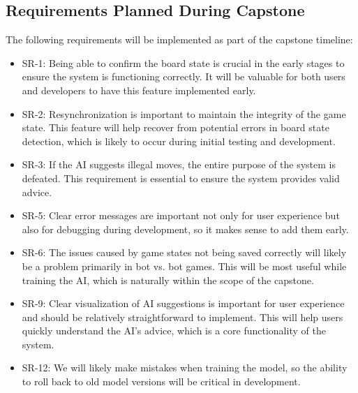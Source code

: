 \documentclass{article}
\begin{document}
\subsection{Requirements Planned During Capstone}\label{subsec:requirements-planned-during-capstone}
The following requirements will be implemented as part of the capstone timeline:
\begin{itemize}
    \item SR-1: Being able to confirm the board state is crucial in the early stages to ensure the system is functioning correctly.
          It will be valuable for both users and developers to have this feature implemented early.
    \item SR-2: Resynchronization is important to maintain the integrity of the game state.
          This feature will help recover from potential errors in board state detection, which is likely to occur during initial testing and development.
    \item SR-3: If the AI suggests illegal moves, the entire purpose of the system is defeated.
          This requirement is essential to ensure the system provides valid advice.
    \item SR-5: Clear error messages are important not only for user experience but also for debugging during development, so it makes sense to add them early.
    \item SR-6: The issues caused by game states not being saved correctly will likely be a problem primarily in bot vs. bot games.
          This will be most useful while training the AI, which is naturally within the scope of the capstone.
    \item SR-9: Clear visualization of AI suggestions is important for user experience and should be relatively straightforward to implement.
          This will help users quickly understand the AI's advice, which is a core functionality of the system.
    \item SR-12: We will likely make mistakes when training the model, so the ability to roll back to old model versions will be critical in development.
\end{itemize}
\end{document}
